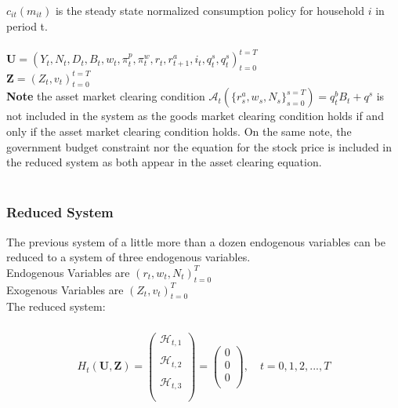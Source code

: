 \documentclass[titlepage]{\econtex}\providecommand{\texname}{FBS-NK}
\begin{document}
$c_{it}(m_{it})$ is the steady state normalized consumption policy for household $i$ in period t. \\ \\
 

 
 
 $\mathbf{U} = \left(Y_{t} , N_{t} ,  D_{t
 }, B_{t}, w_{t} , \pi_{t}^{p} ,\pi_{t}^{w}, r_{t} , r_{t+1}^{a}, i_{t} , q_{t}^{s},  q_{t}^{s} \right)_{t=0}^{t=T}$ \\ 

 
 $\mathbf{Z} = \left(Z_{t} ,v_{t}\right)_{t=0}^{t=T}$ \\
 
 \textbf{Note} the asset market clearing condition   $\mathcal{A}_{t}(\{r_{s}^{a} ,w_{s}, N_{s}\}_{s=0}^{s=T}) =  q^{b}_{t}B_{t} + q^{s}$ is not included in the system as the goods market clearing condition holds if and only if the asset market clearing condition holds. On the same note, the government budget constraint nor the equation for the stock price is included in the reduced system as both appear in the asset clearing equation.  \\ \\
 
 
 
\hypertarget{Reduced System}{}
\subsubsection{Reduced System}
 
The previous system of a little more than a dozen endogenous variables can be reduced to a system of three endogenous variables. \\ 
 
Endogenous Variables are $ \left( r_{t} , w_{t} ,N_{t}\right)_{t=0}^{T}$ \\ 
 
Exogenous Variables are $ \left(Z_{t}, v_{t}\right)_{t=0}^{T}$ \\ 

The reduced system: \\ \\

\begin{eqnarray} 
H_{t}(\mathbf{U},\mathbf{Z})= \begin{pmatrix} 
\mathcal{H}_{t,1} \\ \\ 
\mathcal{H}_{t,2} \\ \\
\mathcal{H}_{t,3} \\ \\
 \end{pmatrix} = \begin{pmatrix} 0 \\ 0 \\ 0 \\ \end{pmatrix} , \quad  t = 0, 1, 2, ..., T 
 \end{eqnarray}
 
\end{document}
